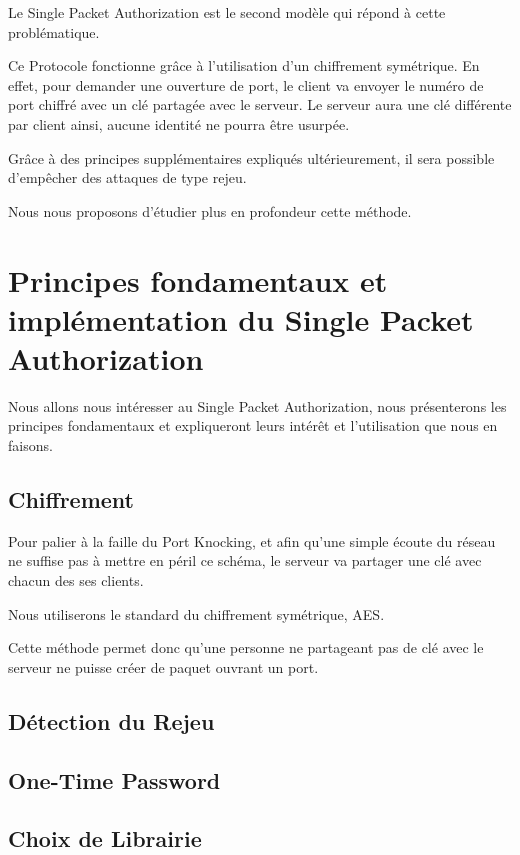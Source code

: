 \documentclass[12pt]{article}
\begin{document}
Le Single Packet Authorization est le second modèle qui répond à cette problématique.

Ce Protocole fonctionne grâce à l'utilisation d'un chiffrement symétrique. En effet, pour demander une ouverture de port, le client va envoyer le numéro de port chiffré avec un clé partagée avec le serveur. Le serveur aura une clé différente par client ainsi, aucune identité ne pourra être usurpée.

Grâce à des principes supplémentaires expliqués ultérieurement, il sera possible d'empêcher des attaques de type rejeu.

Nous nous proposons d'étudier plus en profondeur cette méthode.
\clearpage

\section{Principes fondamentaux et implémentation du Single Packet Authorization}

Nous allons nous intéresser au Single Packet Authorization, nous présenterons les principes fondamentaux et expliqueront leurs intérêt et l'utilisation que nous en faisons.

\subsection{Chiffrement}

Pour palier à la faille du Port Knocking, et afin qu'une simple écoute du réseau ne suffise pas à mettre en péril ce schéma, le serveur va partager une clé avec chacun des ses clients.

Nous utiliserons le standard du chiffrement symétrique, AES.

Cette méthode permet donc qu'une personne ne partageant pas de clé avec le serveur ne puisse créer de paquet ouvrant un port.

\subsection{Détection du Rejeu}

\subsection{One-Time Password}
  
\clearpage  
  
\subsection{Choix de Librairie}
\end{document}
